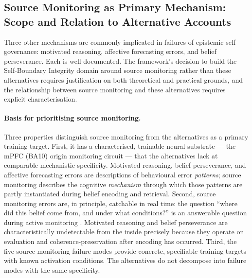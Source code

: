 \documentclass[12pt, a4paper]{article}
\begin{document}
\subsection{Source Monitoring as Primary Mechanism: Scope and Relation to Alternative Accounts}

Three other mechanisms are commonly implicated in failures of epistemic self-governance:
motivated reasoning, affective forecasting errors, and belief perseverance. Each is
well-documented. The framework's decision to build the Self-Boundary Integrity domain
around source monitoring rather than these alternatives requires justification on both
theoretical and practical grounds, and the relationship between source monitoring
and these alternatives requires explicit characterisation.

\paragraph{Basis for prioritising source monitoring.}
Three properties distinguish source monitoring from the alternatives as a primary
training target. First, it has a characterised, trainable neural substrate ---
the mPFC (BA10) origin monitoring circuit \citep{simons2008, subramaniam2012} ---
that the alternatives lack at comparable mechanistic specificity. Motivated reasoning,
belief perseverance, and affective forecasting errors are descriptions of behavioural
error \emph{patterns}; source monitoring describes the cognitive \emph{mechanism}
through which those patterns are partly instantiated during belief encoding and
retrieval. Second, source monitoring errors are, in principle, catchable in real time:
the question ``where did this belief come from, and under what conditions?'' is
an answerable question during active monitoring
\citep{johnson1993, mitchell2009}. Motivated reasoning and belief perseverance
are characteristically undetectable from the inside precisely because they operate
on evaluation and coherence-preservation after encoding has occurred.
Third, the five source monitoring failure modes provide
concrete, specifiable training targets with known activation conditions.
The alternatives do not decompose into failure modes with the same specificity.
\end{document}
